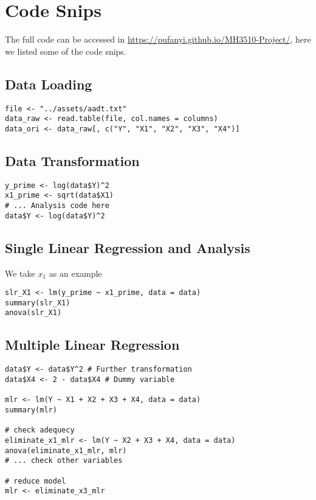 \section{Code Snips}\label{appendix:key_code}

The full code can be accessed in \url{https://pufanyi.github.io/MH3510-Project/}, here we listed some of the code snips.

\subsection{Data Loading}

\begin{lstlisting}
file <- "../assets/aadt.txt"
data_raw <- read.table(file, col.names = columns)
data_ori <- data_raw[, c("Y", "X1", "X2", "X3", "X4")]
\end{lstlisting}

\subsection{Data Transformation}

\begin{lstlisting}
y_prime <- log(data$Y)^2
x1_prime <- sqrt(data$X1)
# ... Analysis code here
data$Y <- log(data$Y)^2
\end{lstlisting}

\subsection{Single Linear Regression and Analysis}

We take $x_1$ as an example

\begin{lstlisting}
slr_X1 <- lm(y_prime ~ x1_prime, data = data)
summary(slr_X1)
anova(slr_X1)
\end{lstlisting}

\subsection{Multiple Linear Regression}

\begin{lstlisting}
data$Y <- data$Y^2 # Further transformation
data$X4 <- 2 - data$X4 # Dummy variable

mlr <- lm(Y ~ X1 + X2 + X3 + X4, data = data)
summary(mlr)

# check adequecy
eliminate_x1_mlr <- lm(Y ~ X2 + X3 + X4, data = data)
anova(eliminate_x1_mlr, mlr)
# ... check other variables

# reduce model
mlr <- eliminate_x3_mlr
\end{lstlisting}

